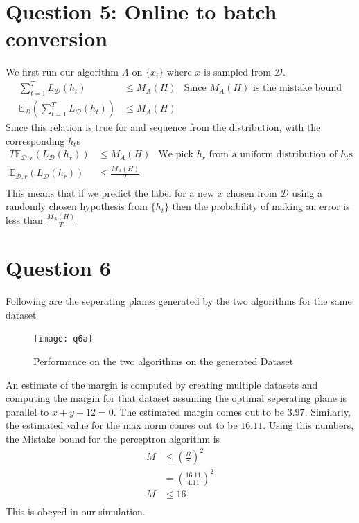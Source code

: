 \documentclass{article}
\begin{document}
\section*{Question 5: Online to batch conversion}
We first run our algorithm {\em A} on $\{x_i\}$ where $x$ is sampled from $\mathcal{D}$.
\begin{align*}
    \sum_{t=1}^{T} L_{\mathcal{D}}(h_t)                                         &\leq M_A(H)& \text{Since $M_A(H)$ is the mistake bound}\\
    \mathbb{E}_{\mathcal{D}}\left( \sum_{t=1}^{T} L_{\mathcal{D}}(h_t)\right)   &\leq M_A(H)& 
\end{align*}
Since this relation is true for and sequence from the distribution, with the corresponding $h_t$s\\
\begin{align*}
    T \mathbb{E}_{\mathcal{D},r}\left( L_{\mathcal{D}}(h_r)\right)              &\leq M_A(H)& \text{We pick $h_r$ from a uniform distribution of $h_t$s}\\
    \mathbb{E}_{\mathcal{D},r}\left( L_{\mathcal{D}}(h_r) \right)               &\leq \frac{M_A(H)}{T}&\\
\end{align*}
This means that if we predict the label for a new $x$ chosen from $\mathcal{D}$ using a randomly chosen hypothesis from $\{h_t\}$ then the probability of making an error is less than $\frac{M_A(H)}{T}$

\clearpage
\section*{Question 6}
Following are the seperating planes generated by the two algorithms for the same dataset
\begin{figure}[h!]
\centering
\texttt{[image: q6a]}
\caption{Performance on the two algorithms on the generated Dataset}
\end{figure}

An estimate of the margin is computed by creating multiple datasets and computing the margin for that dataset assuming the optimal seperating plane is parallel to $x+y+12=0$. The estimated margin comes out to be $3.97$. Similarly, the estimated value for the max norm comes out to be $16.11$. Using this numbers, the Mistake bound for the perceptron algorithm is
\begin{align*}
    M &\leq \left(\frac{R}{\gamma}\right)^2\\
    &=\left(\frac{16.11}{4.11}\right)^2\\
    M &\leq 16\\
\end{align*}
This is obeyed in our simulation.\\
\end{document}

